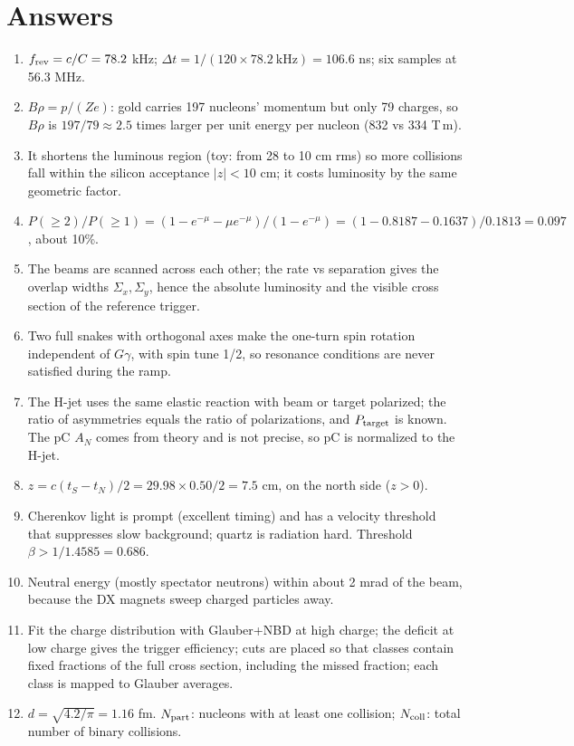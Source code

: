 \documentclass[11pt,letterpaper]{article}
\begin{document}
\appendix
\section{Answers}\label{app:answers}
\begin{enumerate}[label=A\arabic*.]
\item $f_{\rm rev}=c/C=78.2$ kHz; $\Delta t=1/(120\times78.2\ \mathrm{kHz})=106.6$ ns; six samples at 56.3 MHz.
\item $B\rho=p/(Ze)$: gold carries 197 nucleons' momentum but only 79 charges, so $B\rho$ is $197/79\approx2.5$ times larger per unit
energy per nucleon (832 vs 334 T\,m).
\item It shortens the luminous region (toy: from 28 to 10 cm rms) so more collisions fall within the silicon acceptance $|z|<10$ cm;
it costs luminosity by the same geometric factor.
\item $P(\ge2)/P(\ge1)=(1-e^{-\mu}-\mu e^{-\mu})/(1-e^{-\mu})=(1-0.8187-0.1637)/0.1813=0.097$, about 10\%.
\item The beams are scanned across each other; the rate vs separation gives the overlap widths $\Sigma_x,\Sigma_y$, hence the absolute
luminosity and the visible cross section of the reference trigger.
\item Two full snakes with orthogonal axes make the one-turn spin rotation independent of $G\gamma$, with spin tune 1/2, so
resonance conditions are never satisfied during the ramp.
\item The H-jet uses the same elastic reaction with beam or target polarized; the ratio of asymmetries equals the ratio of
polarizations, and $P_{\rm target}$ is known. The pC $A_N$ comes from theory and is not precise, so pC is normalized to the H-jet.
\item $z=c(t_S-t_N)/2=29.98\times0.50/2=7.5$ cm, on the north side ($z>0$).
\item Cherenkov light is prompt (excellent timing) and has a velocity threshold that suppresses slow background; quartz is
radiation hard. Threshold $\beta>1/1.4585=0.686$.
\item Neutral energy (mostly spectator neutrons) within about 2 mrad of the beam, because the DX magnets sweep charged particles away.
\item Fit the charge distribution with Glauber+NBD at high charge; the deficit at low charge gives the trigger efficiency; cuts are
placed so that classes contain fixed fractions of the full cross section, including the missed fraction; each class is mapped to
Glauber averages.
\item $d=\sqrt{4.2/\pi}=1.16$ fm. $N_{\rm part}$: nucleons with at least one collision; $N_{\rm coll}$: total number of binary collisions.

\end{enumerate}
\end{document}
